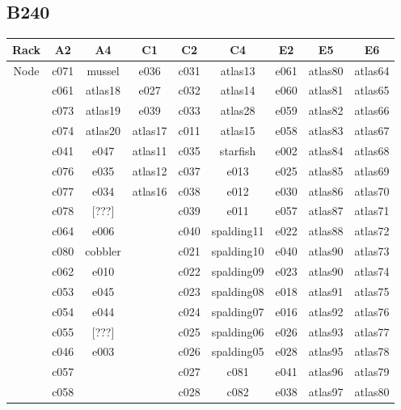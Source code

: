 \documentclass[10pt,letterpaper]{article}
\begin{document}
    \subsection{B240}
        \begin{center}
        \begin{tabular}{ |c|c|c|c|c|c|c|c|c| }
        \hline
        Rack & A2 & A4 & C1 & C2 & C4 & E2 & E5 & E6 \\
        \hline
        \multirow{1}{3em}{Node}

        & c071 & mussel  & e036    & c031 & atlas13    & e061 & atlas80 & atlas64 \\
        & c061 & atlas18 & e027    & c032 & atlas14    & e060 & atlas81 & atlas65 \\
        & c073 & atlas19 & e039    & c033 & atlas28    & e059 & atlas82 & atlas66 \\
        & c074 & atlas20 & atlas17 & c011 & atlas15    & e058 & atlas83 & atlas67 \\
        & c041 & e047    & atlas11 & c035 & starfish   & e002 & atlas84 & atlas68 \\
        & c076 & e035    & atlas12 & c037 & e013       & e025 & atlas85 & atlas69 \\
        & c077 & e034    & atlas16 & c038 & e012       & e030 & atlas86 & atlas70 \\
        & c078 & [???]   &         & c039 & e011       & e057 & atlas87 & atlas71 \\
        & c064 & e006    &         & c040 & spalding11 & e022 & atlas88 & atlas72 \\
        & c080 & cobbler &         & c021 & spalding10 & e040 & atlas90 & atlas73 \\
        & c062 & e010    &         & c022 & spalding09 & e023 & atlas90 & atlas74 \\
        & c053 & e045    &         & c023 & spalding08 & e018 & atlas91 & atlas75 \\
        & c054 & e044    &         & c024 & spalding07 & e016 & atlas92 & atlas76 \\
        & c055 & [???]   &         & c025 & spalding06 & e026 & atlas93 & atlas77 \\
        & c046 & e003    &         & c026 & spalding05 & e028 & atlas95 & atlas78 \\
        & c057 &         &         & c027 & c081       & e041 & atlas96 & atlas79 \\
        & c058 &         &         & c028 & c082       & e038 & atlas97 & atlas80 \\

\end{tabular}
\end{center}
\end{document}
